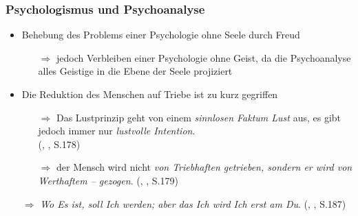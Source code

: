 \documentclass{beamer}
\begin{document}
\begin{frame}
\frametitle{Psychologismus und Psychoanalyse}

  \begin{itemize}
  \setlength{\itemsep}{10pt}
    
    \item Behebung des Problems einer \glqq{}Psychologie ohne Seele\grqq{} durch Freud
    \begin{itemize}
      \item[$\Rightarrow$] jedoch Verbleiben einer \glqq{}Psychologie ohne Geist\grqq{}, da die Psychoanalyse alles Geistige in die Ebene der Seele projiziert
    \end{itemize}
    
    \pause    
    
    \item Die Reduktion des Menschen auf Triebe ist zu kurz gegriffen
    \begin{itemize}
      \item[$\Rightarrow$] Das Lustprinzip geht von einem \textit{\glqq{}sinnlosen Faktum Lust\grqq{}} aus, es gibt jedoch immer nur \textit{\glqq{}lustvolle Intention\grqq{}}.\\ \footnotesize(\citeauthor{Frankl1996}, \citeyear{Frankl1996}, S.178)\normalsize
      \item[$\Rightarrow$] der Mensch wird nicht \textit{\glqq{}von Triebhaften getrieben, sondern er wird von Werthaftem -- gezogen\grqq{}}. \footnotesize(\citeauthor{Frankl1996}, \citeyear{Frankl1996}, S.179)\normalsize
    \end{itemize}
  
    \pause  
  
    \item[$\Rightarrow$] \textit{\glqq{}\textbf{\flqq{}}Wo Es ist, soll Ich werden\textbf{\frqq{}}; aber das Ich wird Ich erst am Du\grqq{}}. \footnotesize(\citeauthor{Frankl1996}, \citeyear{Frankl1996}, S.187)\normalsize
  
  \end{itemize}
  
\end{frame}
\end{document}
